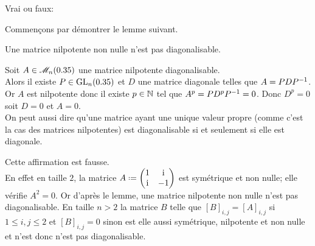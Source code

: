 \begin{exercice}
    Vrai ou faux: 
\end{exercice}

Commençons par démontrer le lemme suivant.

\begin{lemme} 
    Une matrice nilpotente non nulle n'est pas diagonalisable.
\end{lemme}
    
\begin{preuve}
    Soit $A \in \mathscr{M}_n(0.35)$ une matrice nilpotente diagonalisable. \\
    Alors il existe $P \in \mathrm{GL}_n(0.35)$ et $D$ une matrice diagonale telles que $A = PDP^{-1}$. Or $A$ est nilpotente donc il existe $p \in \mathbb{N}$ tel que $A^p = P D^p P^{-1} = 0$. Donc $D^p = 0$ soit $D = 0$ et $A = 0$. \\
    On peut aussi dire qu'une matrice ayant une unique valeur propre (comme c'est la cas des matrices nilpotentes) est diagonalisable si et seulement si elle est diagonale.
\end{preuve}

\begin{solution}
    Cette affirmation est fausse. \\
    En effet en taille $2$, la matrice $A \defeq \begin{pmatrix}
        1 & \mi \\
        \mi & -1
    \end{pmatrix}$ est symétrique et non nulle; elle vérifie $A^2 = 0$. Or d'après le lemme, une matrice nilpotente non nulle n'est pas diagonalisable. En taille $n > 2$ la matrice $B$ telle que $[B]_{i,j} = [A]_{i,j}$ si $1 \leqslant i, j \leqslant 2$ et $[B]_{i,j} = 0$ sinon est elle aussi symétrique, nilpotente et non nulle et n'est donc n'est pas diagonalisable. 
\end{solution}   

